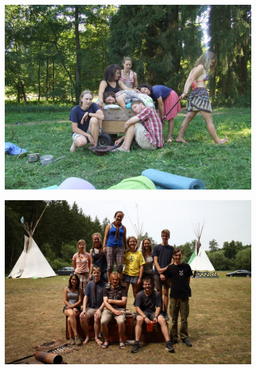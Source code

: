 \begin{center}

\includegraphics[width=11cm]{img/udove_hanyetu.JPG}
\vspace*{10pt}

\includegraphics[width=11cm]{img/udove_anpetu.JPG}

\clearpage
\end{center}
